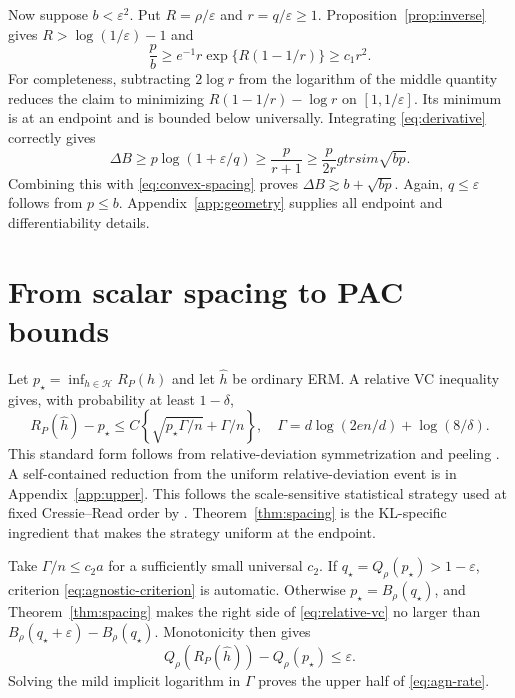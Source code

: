 \documentclass{article}
\theoremstyle{remark}
\newcommand{\cH}{\mathcal H}
\newcommand{\eps}{\varepsilon}
\begin{document}
Now suppose $b<\eps^2$.  Put $R=\rho/\eps$ and $r=q/\eps\ge1$.
Proposition~\ref{prop:inverse} gives $R>\log(1/\eps)-1$ and
\begin{equation}
 \frac pb\ge e^{-1}r\exp\{R(1-1/r)\}\ge c_1r^2.
 \label{eq:ratio-pb}
\end{equation}
For completeness, subtracting $2\log r$ from the logarithm of the middle
quantity reduces the claim to minimizing
$R(1-1/r)-\log r$ on $[1,1/\eps]$.  Its minimum is at an endpoint and is
bounded below universally.  Integrating \eqref{eq:derivative} correctly gives
\begin{equation}
 \Delta B\ge p\log(1+\eps/q)
 \ge\frac{p}{r+1}\ge\frac{p}{2r}gtrsim\sqrt{bp}.
 \label{eq:integrated-derivative}
\end{equation}
Combining this with \eqref{eq:convex-spacing} proves
$\Delta B\gtrsim b+\sqrt{bp}$.  Again, $q\le\eps$ follows from $p\le b$.
Appendix~\ref{app:geometry} supplies all endpoint and differentiability
details.

\section{From scalar spacing to PAC bounds}
\label{sec:pac}

Let $p_\star=\inf_{h\in\cH}R_P(h)$ and let $\widehat h$ be ordinary ERM.  A
relative VC inequality gives, with probability at least $1-\delta$,
\begin{equation}
 R_P(\widehat h)-p_\star
 \le C\left\{\sqrt{p_\star\Gamma/n}+\Gamma/n\right\},
 \quad
 \Gamma=d\log(2en/d)+\log(8/\delta).
 \label{eq:relative-vc}
\end{equation}
This standard form follows from relative-deviation symmetrization and peeling
\citep{vapnik1971uniform,boucheron2005classification}.  A self-contained
reduction from the uniform relative-deviation event is in
Appendix~\ref{app:upper}.  This follows the scale-sensitive statistical
strategy used at fixed Cressie--Read order by
\citet{aignerhorev2026cressie}.  Theorem~\ref{thm:spacing} is the KL-specific
ingredient that makes the strategy uniform at the endpoint.

Take $\Gamma/n\le c_2a$ for a sufficiently small universal $c_2$.  If
$q_\star=Q_\rho(p_\star)>1-\eps$, criterion
\eqref{eq:agnostic-criterion} is automatic.  Otherwise
$p_\star=B_\rho(q_\star)$, and Theorem~\ref{thm:spacing} makes the right side
of \eqref{eq:relative-vc} no larger than
$B_\rho(q_\star+\eps)-B_\rho(q_\star)$.  Monotonicity then gives
\[
 Q_\rho(R_P(\widehat h))-Q_\rho(p_\star)\le\eps.
\]
Solving the mild implicit logarithm in $\Gamma$ proves the upper half of
\eqref{eq:agn-rate}.
\end{document}

